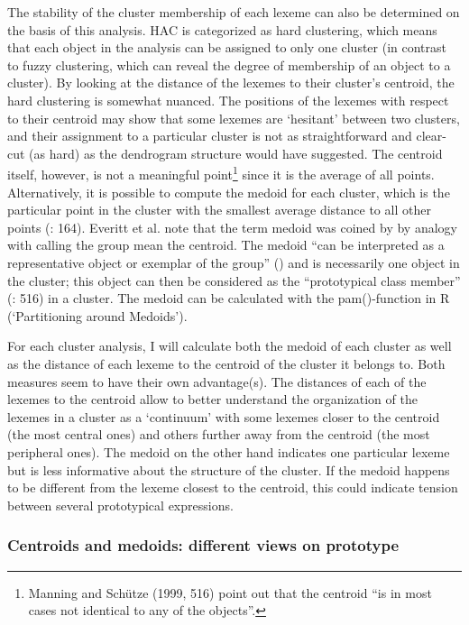 The stability of the cluster membership of each lexeme can also be determined on the basis of this analysis. HAC is categorized as hard clustering, which means that each object in the analysis can be assigned to only one cluster (in contrast to fuzzy clustering, which can reveal the degree of membership of an object to a cluster). By looking at the distance of the lexemes to their cluster’s centroid, the hard clustering is somewhat nuanced. The positions of the lexemes with respect to their centroid may show that some lexemes are ‘hesitant’ between two clusters, and their assignment to a particular cluster is not as straightforward and clear-cut (as hard) as the dendrogram structure would have suggested. The centroid itself, however, is not a meaningful point\footnote{Manning and Schütze (1999, 516) point out that the centroid “is in most cases not identical to any of the objects”.} since it is the average of all points. Alternatively, it is possible to compute the medoid for each cluster, which is the particular point in the cluster with the smallest average distance to all other points (\citealt{divjak_structuring_2010}: 164). Everitt et al. note that the term medoid was coined by \citet{kaufman_finding_1990} by analogy with calling the group mean the centroid. The medoid “can be interpreted as a representative object or exemplar of the group” (\citealt[113]{everitt_cluster_2011}) and is necessarily one object in the cluster; this object can then be considered as the “prototypical class member” (\citealt{manning_foundations_1999}: 516) in a cluster. The medoid can be calculated with the pam(){}-function in R (‘Partitioning around Medoids’).



For each cluster analysis, I will calculate both the medoid of each cluster as well as the distance of each lexeme to the centroid of the cluster it belongs to. Both measures seem to have their own advantage(s). The distances of each of the lexemes to the centroid allow to better understand the organization of the lexemes in a cluster as a ‘continuum’ with some lexemes closer to the centroid (the most central ones) and others further away from the centroid (the most peripheral ones). The medoid on the other hand indicates one particular lexeme but is less informative about the structure of the cluster. If the medoid happens to be different from the lexeme closest to the centroid, this could indicate tension between several prototypical expressions.


\subsubsection{\label{sec:3.8.1.3}  Centroids and medoids: different views on prototype}

